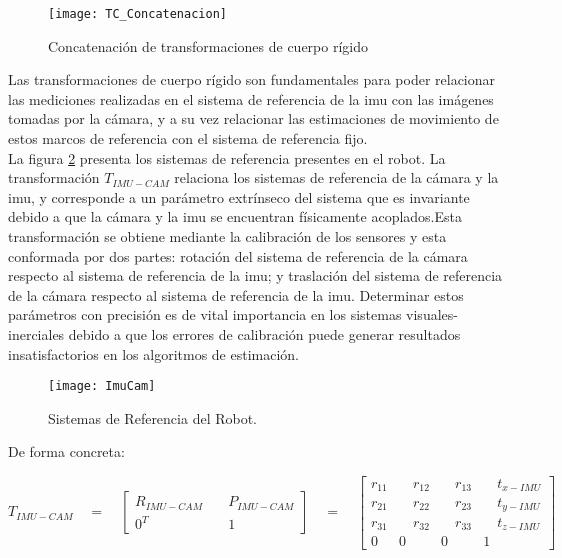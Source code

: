  \begin{figure}[H]
	\centering
	\texttt{[image: TC\_Concatenacion]}
	\caption[Concatenación de transformaciones de cuerpo rígido]{Concatenación de transformaciones de cuerpo rígido}
	\label{imagen:TC_Concatenacion}
\end{figure} 

Las transformaciones de cuerpo rígido son fundamentales para poder relacionar las mediciones realizadas en el sistema de referencia de la imu con las imágenes tomadas por la cámara, y a su vez relacionar las estimaciones de movimiento de estos marcos de referencia con el sistema de referencia fijo.\\

La figura \ref{fig:TransformacionesRobot} presenta los sistemas de referencia presentes en el robot. La transformación ${T}_{IMU-CAM}$ relaciona los sistemas de referencia de la cámara y la imu, y corresponde a un parámetro extrínseco del sistema que es invariante debido a que la cámara y la imu se encuentran físicamente acoplados.Esta transformación se obtiene mediante la calibración de los sensores y esta conformada por dos partes: rotación del sistema de referencia de la cámara respecto al sistema de referencia de la imu; y traslación del sistema de referencia de la cámara respecto al sistema de referencia de la imu. Determinar estos parámetros con precisión es de vital importancia en los sistemas visuales-inerciales debido a que los errores de calibración puede generar resultados insatisfactorios en los algoritmos de estimación.



\begin{figure}[H]
	\centering
	\texttt{[image: ImuCam]}
	\caption[Sistemas de Referencia del Robot]{Sistemas de Referencia del Robot.}
	\label{fig:TransformacionesRobot}
\end{figure}


De forma concreta:

\begin{equation}
{ { T } }_{ IMU -CAM }\quad =\quad \begin{bmatrix} R_{ IMU - CAM } & \quad { { P } }_{ IMU - CAM } \\ { 0 }^{ T } & \quad 1 \end{bmatrix}\quad =\quad \begin{bmatrix} { r }_{ 11 } & { \quad r }_{ 12 } & { \quad r }_{ 13 } & \quad t_{ x-IMU } \\ { r }_{ 21 } & { \quad r }_{ 22 } & { \quad r }_{ 23 } & { \quad t }_{ y-IMU } \\ { r }_{ 31 } & { \quad r }_{ 32 } & { \quad r }_{ 33 } & \quad { t }_{ z-IMU } \\ 0 & 0 & 0 & 1 \end{bmatrix}\quad 
\label{eq:transformacionIMUCAM} 
\end{equation}

